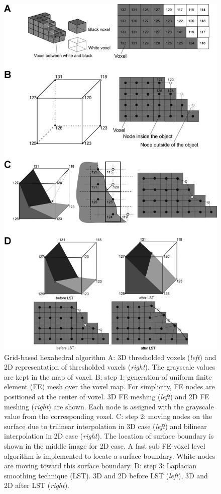 \renewcommand{\imsize}{0.618\linewidth}
\begin{figure}[p]
	\centering
	\includegraphics[width=\imsize]{img/Tsuda2008/Tsuda-04}
	\caption{Grid-based hexahedral algorithm A: 3D thresholded voxels (\textit{left}) and 2D representation of thresholded voxels (\textit{right}). The grayscale values are kept in the map of voxel. B: step 1: generation of uniform finite element (FE) mesh over the voxel map. For simplicity, FE nodes are positioned at the center of voxel. 3D FE meshing (\textit{left}) and 2D FE meshing (\textit{right}) are shown. Each node is assigned with the grayscale value from the corresponding voxel. C: step 2: moving nodes on the surface due to trilinear interpolation in 3D case (\textit{left}) and bilinear interpolation in 2D case (\textit{right}). The location of surface boundary is shown in the middle image for 2D case. A fast sub FE-voxel level algorithm is implemented to locate a surface boundary. White nodes are moving toward this surface boundary. D: step 3: Laplacian smoothing technique (LST). 3D and 2D before LST (\textit{left}), 3D and 2D after LST (\textit{right}).}
	\label{fig:hexahedral}
\end{figure}

